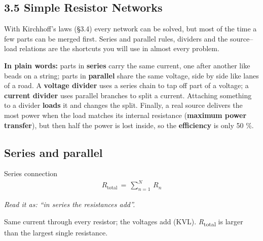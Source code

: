 \documentclass[11pt]{article}
\begin{document}
\begin{keepsection}
\section{3.5 Simple Resistor Networks}

With Kirchhoff’s laws (§3.4) every network can be solved, but most of the time a few parts can be merged first. Series and parallel rules, dividers and the source–load relations are the shortcuts you will use in almost every problem.

\begin{plainbox}\textbf{In plain words:} parts in \textbf{series} carry the same current, one after another like beads on a string; parts in \textbf{parallel} share the same voltage, side by side like lanes of a road. A \textbf{voltage divider} uses a series chain to tap off part of a voltage; a \textbf{current divider} uses parallel branches to split a current. Attaching something to a divider \textbf{loads} it and changes the split. Finally, a real source delivers the most power when the load matches its internal resistance (\textbf{maximum power transfer}), but then half the power is lost inside, so the \textbf{efficiency} is only 50 \%.\end{plainbox}

\begin{keepsection}
\subsection{Series and parallel}

\begin{equationcard}{Series connection}
\[ \begin{gathered} {R}_{\text{total}}\, =\, \sum_{{n}=1}^{{N}} \, {R}_{{n}} \end{gathered} \]
{\small \emph{Read it as: “in series the resistances add”.}\par Same current through every resistor; the voltages add (KVL). \textit{R}\textsubscript{total} is larger than the largest single resistance.}
\end{equationcard}


\end{keepsection}
\end{keepsection}
\end{document}
